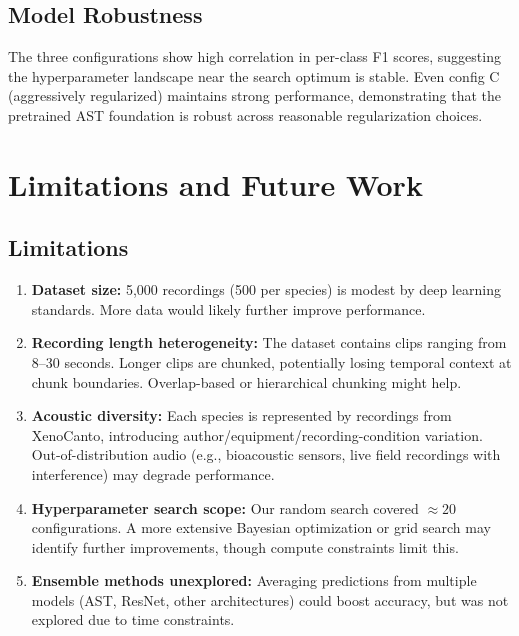 \documentclass[11pt, a4paper]{article}
\begin{document}
\subsection{Model Robustness}
The three configurations show high correlation in per-class F1 scores, suggesting the hyperparameter landscape near the search optimum is stable. Even config C (aggressively regularized) maintains strong performance, demonstrating that the pretrained AST foundation is robust across reasonable regularization choices.

\section{Limitations and Future Work}

\subsection{Limitations}
\begin{enumerate}
  \item \textbf{Dataset size:} 5,000 recordings (500 per species) is modest by deep learning standards. More data would likely further improve performance.
  \item \textbf{Recording length heterogeneity:} The dataset contains clips ranging from 8--30 seconds. Longer clips are chunked, potentially losing temporal context at chunk boundaries. Overlap-based or hierarchical chunking might help.
  \item \textbf{Acoustic diversity:} Each species is represented by recordings from XenoCanto, introducing author/equipment/recording-condition variation. Out-of-distribution audio (e.g., bioacoustic sensors, live field recordings with interference) may degrade performance.
  \item \textbf{Hyperparameter search scope:} Our random search covered $\approx 20$ configurations. A more extensive Bayesian optimization or grid search may identify further improvements, though compute constraints limit this.
  \item \textbf{Ensemble methods unexplored:} Averaging predictions from multiple models (AST, ResNet, other architectures) could boost accuracy, but was not explored due to time constraints.
\end{enumerate}
\end{document}
